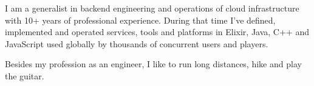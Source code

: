 

\begin{cvparagraph}

I am a generalist in backend engineering and operations of cloud infrastructure with 10+ years of professional experience. During that time I've defined, implemented and operated services, tools and platforms in Elixir, Java, C++ and JavaScript used globally by thousands of concurrent users and players. 

Besides my profession as an engineer, I like to run long distances, hike and play the guitar.

\end{cvparagraph}
